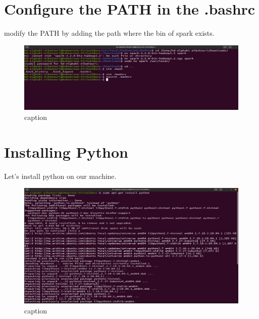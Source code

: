 \begin{spacing}{1.2}
\section{Configure the PATH in the .bashrc}

\par modify the PATH by adding the path where the bin of spark exists.
\\
\begin{figure}[!htb] 
\begin{center} 
\includegraphics[width=1\linewidth]{Big_Data/Spark/Spark Installation & Configuration/.bashrc config.jpg} 
\end{center} 
\caption{caption} 
\end{figure} 
\FloatBarrier

\section{Installing Python}


\par Let's install python on our machine.
\\
\begin{figure}[!htb] 
\begin{center} 
\includegraphics[width=1\linewidth]{Big_Data/Spark/Spark Installation & Configuration/Installing Python.jpg} 
\end{center} 
\caption{caption} 
\end{figure} 
\FloatBarrier



\end{spacing}

